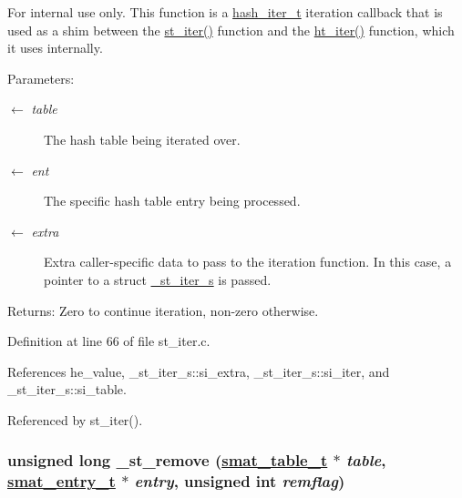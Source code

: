 \begin{Desc}
\item[For internal use only.]
This function is a \hyperlink{group__dbprim__hash_ga3}{hash\_\-iter\_\-t} iteration callback that is used as a shim between the \hyperlink{group__dbprim__smat_ga16}{st\_\-iter()} function and the \hyperlink{group__dbprim__hash_ga14}{ht\_\-iter()} function, which it uses internally.

\begin{Desc}
\item[Parameters:]
\begin{description}
\item[\mbox{$\leftarrow$} {\em table}]The hash table being iterated over. \item[\mbox{$\leftarrow$} {\em ent}]The specific hash table entry being processed. \item[\mbox{$\leftarrow$} {\em extra}]Extra caller-specific data to pass to the iteration function. In this case, a pointer to a struct \hyperlink{struct__st__iter__s}{\_\-st\_\-iter\_\-s} is passed.\end{description}
\end{Desc}
\begin{Desc}
\item[Returns:]Zero to continue iteration, non-zero otherwise.\end{Desc}
\end{Desc}


Definition at line 66 of file st\_\-iter.c.

References he\_\-value, \_\-st\_\-iter\_\-s::si\_\-extra, \_\-st\_\-iter\_\-s::si\_\-iter, and \_\-st\_\-iter\_\-s::si\_\-table.

Referenced by st\_\-iter().\hypertarget{group__dbprim__smat_ga24}{
\subsubsection[\_\-st\_\-remove]{\setlength{\rightskip}{0pt plus 5cm}unsigned long \_\-st\_\-remove (\hyperlink{struct__smat__table__s}{smat\_\-table\_\-t} $\ast$ {\em table}, \hyperlink{struct__smat__entry__s}{smat\_\-entry\_\-t} $\ast$ {\em entry}, unsigned int {\em remflag})}}
\label{group__dbprim__smat_ga24}


